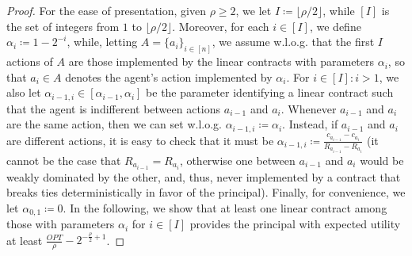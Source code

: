 \begin{proof}
	For the ease of presentation, given $\rho \ge 2$, we let $I \coloneqq \lfloor \rho / 2  \rfloor $, while $[I]$ is the set of integers from $1$ to $\lfloor \rho / 2  \rfloor$.
	Moreover, for each $i \in [I]$, we define $\alpha_i \coloneqq 1 - 2^{-i} $, while, letting $A = \{ a_i \}_{i \in [n]}$, we assume w.l.o.g. that the first $I$ actions of $A$ are those implemented by the linear contracts with parameters $\alpha_i$, so that $a_i \in A $ denotes the agent's action implemented by $\alpha_i$.
	For $i \in [I]: i > 1$, we also let $\alpha_{i-1, i} \in \left[  \alpha_{i-1}, \alpha_i \right]$ be the parameter identifying a linear contract such that the agent is indifferent between actions $a_{i-1}$ and $a_i$.
	Whenever $a_{i-1}$ and $a_i$ are the same action, then we can set w.l.o.g. $\alpha_{i-1, i} \coloneqq \alpha_i$.
	Instead, if $a_{i-1}$ and $a_i$ are different actions, it is easy to check that it must be $\alpha_{i-1, i} \coloneqq \frac{c_{a_{i-1}} - c_{a_i}}{R_{a_{i-1}} - R_{a_i}}$ (it cannot be the case that $R_{a_{i-1}} = R_{a_i}$, otherwise one between $a_{i-1}$ and $a_i$ would be weakly dominated by the other, and, thus, never implemented by a contract that breaks ties deterministically in favor of the principal).
	Finally, for convenience, we let $\alpha_{0,1} \coloneqq 0$.
	In the following, we show that at least one linear contract among those with parameters $\alpha_i$ for $i \in [I]$ provides the principal with expected utility at least $\frac{OPT}{\rho} - 2^{-\frac{\rho}{2}+1 }$.
	

\end{proof}
